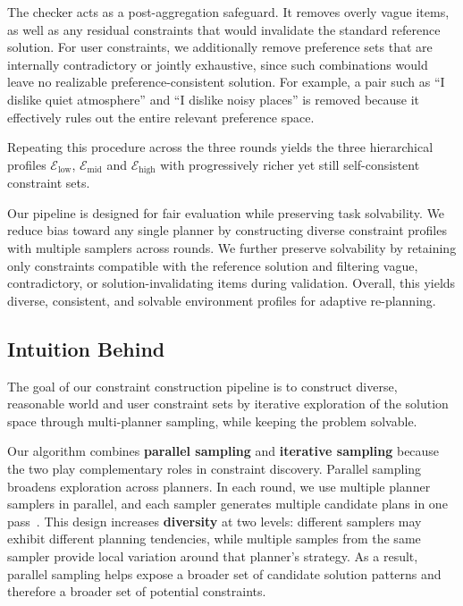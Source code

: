 The checker acts as a post-aggregation safeguard. It removes overly vague items, as well as any residual constraints that would invalidate the standard reference solution. For user constraints, we additionally remove preference sets that are internally contradictory or jointly exhaustive, since such combinations would leave no realizable preference-consistent solution. For example, a pair such as ``I dislike quiet atmosphere'' and ``I dislike noisy places'' is removed because it effectively rules out the entire relevant preference space.

Repeating this procedure across the three rounds yields the three hierarchical profiles
$\mathcal{E}_{\mathrm{low}}$, $\mathcal{E}_{\mathrm{mid}}$ and $\mathcal{E}_{\mathrm{high}}$ with progressively richer yet still self-consistent constraint sets. 

Our pipeline is designed for fair evaluation while preserving task solvability. We reduce bias toward any single planner by constructing diverse constraint profiles with multiple samplers across rounds. We further preserve solvability by retaining only constraints compatible with the reference solution and filtering vague, contradictory, or solution-invalidating items during validation. Overall, this yields diverse, consistent, and solvable environment profiles for adaptive re-planning.

\subsection{Intuition Behind}
\label{app:env_cons_intuition}

The goal of our constraint construction pipeline is to construct diverse, reasonable world and user constraint sets by iterative exploration of the solution space through multi-planner sampling, while keeping the problem solvable.

Our algorithm combines \textbf{parallel sampling} and \textbf{iterative sampling} because the two play complementary roles in constraint discovery.
Parallel sampling broadens exploration across planners. 
In each round, we use multiple planner samplers in parallel, and each sampler generates multiple candidate plans in one pass~\citep{verbalized-sampling}. 
This design increases \textbf{diversity} at two levels: different samplers may exhibit different planning tendencies, while multiple samples from the same sampler provide local variation around that planner's strategy. 
As a result, parallel sampling helps expose a broader set of candidate solution patterns and therefore a broader set of potential constraints.


